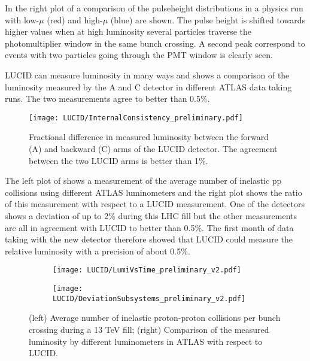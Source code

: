 In the right plot of  a comparison of the pulseheight distributions in a physics run 
with low-$\mu$ (red) and high-$\mu$ (blue) are shown. The pulse height is shifted towards higher values when at high 
luminosity several particles traverse the photomultiplier window in the same bunch crossing.
A second peak correspond to events with two particles going through the PMT window is clearly seen.

LUCID can measure luminosity in many ways and  shows a comparison of the 
luminosity measured by the A and C detector in different ATLAS data taking runs. The two measurements agree to better than 0.5$\%$.

\begin{figure}
\centering
\texttt{[image: LUCID/InternalConsistency\_preliminary.pdf]}
\caption{Fractional difference in measured luminosity between the forward (A) and backward (C) arms of the LUCID 
detector. The agreement between the two LUCID arms is better than 1$\%$.}
\label{fig:InternalConsistency}
\end{figure}

The left plot of  shows a measurement of the average number of inelastic pp collisions 
using different ATLAS 
luminometers and the right plot shows the ratio of this measurement with respect to a LUCID measurement. One of the 
detectors shows a deviation of up to 2$\%$ during this LHC fill but the other measurements are all in agreement 
with LUCID to better than 0.5$\%$.
The first month of data taking with the new detector therefore showed that LUCID could measure the relative 
luminosity with a precision of about 0.5$\%$.

\begin{figure}
\centering
\begin{subfigure}{.5\textwidth}
  \centering
  \texttt{[image: LUCID/LumiVsTime\_preliminary\_v2.pdf]}
  \label{fig:sub3}
\end{subfigure}%
\begin{subfigure}{.5\textwidth}
  \centering
  \texttt{[image: LUCID/DeviationSubsystems\_preliminary\_v2.pdf]}
  \label{fig:sub4}
\end{subfigure}
\caption{(left) Average number of inelastic proton-proton collisions per bunch crossing during a 13 TeV fill; 
(right) Comparison of the measured luminosity by different luminometers in ATLAS with respect to LUCID.}
\label{fig:LumiVsTime}
\end{figure}

